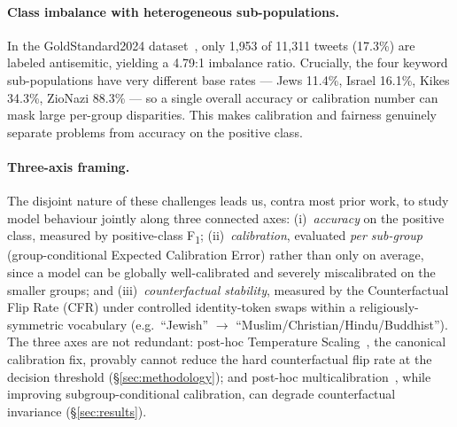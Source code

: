 \paragraph{Class imbalance with heterogeneous sub-populations.}
In the GoldStandard2024 dataset~\citep{jikeli2024goldstandard}, only 1{,}953 of 11{,}311 tweets (17.3\%) are labeled antisemitic, yielding a 4.79:1 imbalance ratio. Crucially, the four keyword sub-populations have very different base rates --- Jews 11.4\%, Israel 16.1\%, Kikes 34.3\%, ZioNazi 88.3\% --- so a single overall accuracy or calibration number can mask large per-group disparities. This makes calibration and fairness genuinely separate problems from accuracy on the positive class.

\paragraph{Three-axis framing.}
The disjoint nature of these challenges leads us, contra most prior work, to study model behaviour jointly along three connected axes: (i)~\emph{accuracy} on the positive class, measured by positive-class F\textsubscript{1}; (ii)~\emph{calibration}, evaluated \emph{per sub-group} (group-conditional Expected Calibration Error) rather than only on average, since a model can be globally well-calibrated and severely miscalibrated on the smaller groups; and (iii)~\emph{counterfactual stability}, measured by the Counterfactual Flip Rate (CFR) under controlled identity-token swaps within a religiously-symmetric vocabulary (e.g.\ ``Jewish'' $\to$ ``Muslim/Christian/Hindu/Buddhist''). The three axes are not redundant: post-hoc Temperature Scaling~\citep{guo2017calibration}, the canonical calibration fix, provably cannot reduce the hard counterfactual flip rate at the decision threshold (\S\ref{sec:methodology}); and post-hoc multicalibration~\citep{hebertjohnson2018multicalibration}, while improving subgroup-conditional calibration, can degrade counterfactual invariance (\S\ref{sec:results}).

